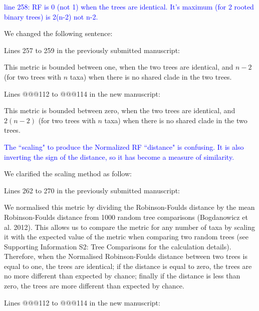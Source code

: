 \documentclass[11pt]{letter}
\begin{document}
\begin{letter}{}
\textcolor{blue}{line 258: RF is 0 (not 1) when the trees are identical. It's maximum (for 2 rooted binary trees) is 2(n-2) not n-2.}

We changed the following sentence:

Lines 257 to 259 in the previously submitted manuscript:

\hfill\begin{minipage}{\dimexpr\textwidth-1cm}
This metric is bounded between one, when the two trees are identical, and $n-2$ (for two trees with $n$ taxa) when there is no shared clade in the two trees.
\end{minipage}

Lines @@@112 to @@@114 in the new manuscript:

\hfill\begin{minipage}{\dimexpr\textwidth-1cm}
This metric is bounded between zero, when the two trees are identical, and $2(n-2)$ (for two trees with $n$ taxa) when there is no shared clade in the two trees.
\end{minipage}



\textcolor{blue}{The ``scaling" to produce the Normalized RF ``distance" is confusing. It is also inverting the sign of the distance, so it has become a measure of similarity.}

We clarified the scaling method as follow:

Lines 262 to 270 in the previously submitted manuscript:

\hfill\begin{minipage}{\dimexpr\textwidth-1cm}
We normalised this metric by dividing the Robinson-Foulds distance by the mean Robinson-Foulds distance from 1000 random tree comparisons (Bogdanowicz et al. 2012). This allows us to compare the metric for any number of taxa by scaling it with the expected value of the metric when comparing two random trees (see Supporting Information S2: Tree Comparisons for the calculation details). Therefore, when the Normalised Robinson-Foulds distance between two trees is equal to one, the trees are identical; if the distance is equal to zero, the trees are no more different than expected by chance; finally if the distance is less than zero, the trees are more different than expected by chance.
\end{minipage}

Lines @@@112 to @@@114 in the new manuscript:


\end{letter}
\end{document}
